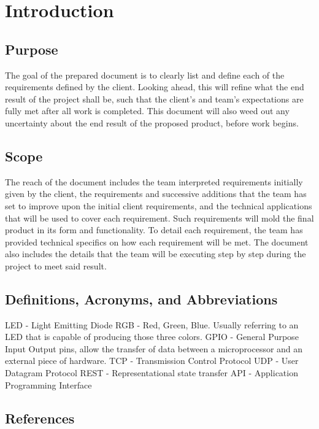 \documentclass[onecolumn, draftclsnofoot,10pt, compsoc]{IEEEtran}
\begin{document}
	\section*{Introduction}

		\subsection*{Purpose}
				The goal of the prepared document is to clearly list and define each of the requirements defined by the client.  Looking ahead, this will refine what the end result of the project shall be,
				 such that the client’s and team’s expectations are fully met after all work is completed.  This document will also weed out any uncertainty about the end result of the proposed product,
				 before work begins.
		\subsection*{Scope}
		The reach of the document includes the team interpreted requirements initially given by the client, the requirements and successive additions that the team has set to improve upon the initial
		client requirements, and the technical applications that will be used to cover each requirement.  Such requirements will mold the final product in its form and functionality.
		To detail each requirement, the team has provided technical specifics on how each requirement will be met.  The document also includes the details that the team will be executing step by step
		during the project to meet said result.

		\subsection*{Definitions, Acronyms, and Abbreviations}
		LED - Light Emitting Diode
		RGB - Red, Green, Blue. Usually referring to an LED that is capable of producing those three colors.
		GPIO - General Purpose Input Output pins, allow the transfer of data between a microprocessor and an external piece of hardware.
		TCP - Transmission Control Protocol
		UDP - User Datagram Protocol
		REST - Representational state transfer
		API - Application Programming Interface

		\subsection*{References}
\end{document}
